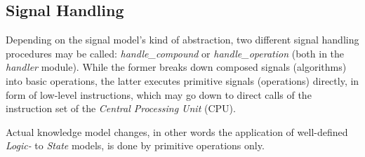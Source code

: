 %
%
%
%
%
%
%

\subsection{Signal Handling}
\label{signal_handling_heading}

Depending on the signal model's kind of abstraction, two different signal
handling procedures may be called: \emph{handle\_compound} or
\emph{handle\_operation} (both in the \emph{handler} module). While the former
breaks down composed signals (algorithms) into basic operations, the latter
executes primitive signals (operations) directly, in form of low-level
instructions, which may go down to direct calls of the instruction set of the
\emph{Central Processing Unit} (CPU).

Actual knowledge model changes, in other words the application of well-defined
\emph{Logic-} to \emph{State} models, is done by primitive operations only.
